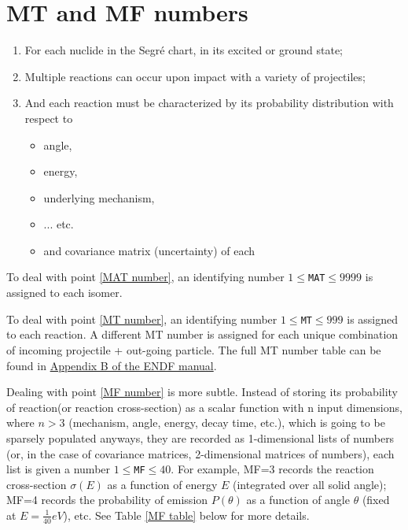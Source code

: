 \documentclass[a4paper, 12pt]{article}
\begin{document}
\section{MT and MF numbers}
\begin{enumerate}
    \item For each nuclide in the Segr\'{e} chart, in its excited or ground state; \label{MAT number}
    \item Multiple reactions can occur upon impact with a variety of projectiles;\label{MT number}
    \item And each reaction must be characterized by its probability distribution with respect to
    \begin{itemize} \label{MF number}
         \item angle,
         \item energy,
         \item underlying mechanism,
         \item ... etc.
         \item and covariance matrix (uncertainty) of each
     \end{itemize} 
\end{enumerate}

To deal with point \ref{MAT number}, an identifying number $1\le$\texttt{MAT}$\le9999$ is assigned to each isomer.

To deal with point \ref{MT number}, an identifying number $1\le$\texttt{MT}$\le999$ is assigned to each reaction.
A different MT number is assigned for each unique combination of incoming projectile + out-going particle.
The full MT number table can be found in \href{https://www.oecd-nea.org/dbdata/data/manual-endf/endf102_MT.pdf}{Appendix B of the ENDF manual}.

Dealing with point \ref{MF number} is more subtle. Instead of storing its probability of reaction(or reaction cross-section) as a scalar function with n input dimensions, where $n>3$ (mechanism, angle, energy, decay time, etc.), which is going to be sparsely populated anyways, they are recorded as 1-dimensional lists of numbers (or, in the case of covariance matrices, 2-dimensional matrices of numbers), each list is given a number $1\le$\texttt{MF}$\le40$. For example, MF=3 records the reaction cross-section $\sigma(E)$ as a function of energy $E$ (integrated over all solid angle); MF=4 records the probability of emission $P(\theta)$ as a function of angle $\theta$ (fixed at $E= \frac{1}{40}eV$), etc. See Table \ref{MF table} below for more details.
\end{document}
